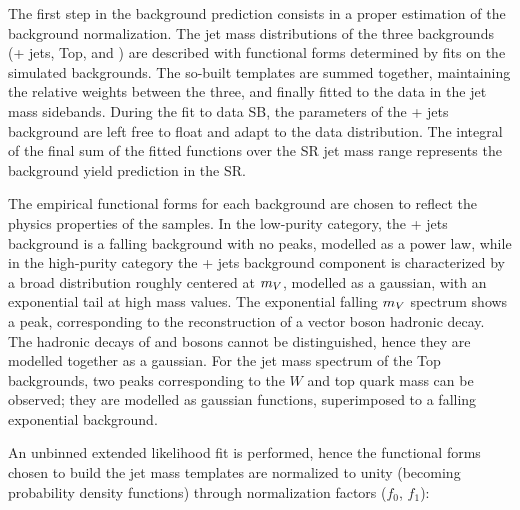 The first step in the background prediction consists in a proper estimation of the background normalization. The jet mass distributions of the three backgrounds (\V + jets, Top, and \VV) are described with functional forms determined by fits on the simulated backgrounds. The so-built templates are summed together, maintaining the relative weights between the three, and finally fitted to the data in the jet mass sidebands. During the fit to data SB, the parameters of the \V + jets background are left free to float and adapt to the data distribution. The integral of the final sum of the fitted functions over the SR jet mass range represents the background yield prediction in the SR.


\noindent The empirical functional forms for each background are chosen to reflect the physics properties of the samples. In the low-purity category, the \V+ jets background is a falling background with no peaks, modelled as a power law, while in the high-purity category the \V + jets background component is characterized by a broad distribution roughly centered at $m_V$, modelled as a gaussian, with an exponential tail at high mass values. The exponential falling \VV $m_V$ spectrum shows a peak, corresponding to the reconstruction of a vector boson hadronic decay. The hadronic decays of \W and \Z bosons cannot be distinguished, hence they are modelled together as a gaussian. For the jet mass spectrum of the Top backgrounds, two peaks corresponding to the $W$ and top quark mass can be observed; they are modelled as gaussian functions, superimposed to a falling exponential background.

\noindent An unbinned extended likelihood fit is performed, hence the functional forms chosen to build the jet mass templates are normalized to unity (becoming probability density functions) through normalization factors ($f_0$, $f_1$):

